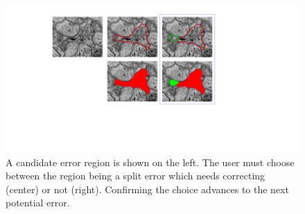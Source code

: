 \begin{figure}[t]
\includegraphics[width=\linewidth]{gfx/user_interface_split.pdf}
\caption{ A candidate error region is shown on the left. The user must choose between the region being a split error which needs correcting (center) or not (right). Confirming the choice advances to the next potential error.} %
\label{fig:ui}
\end{figure}

%
%
